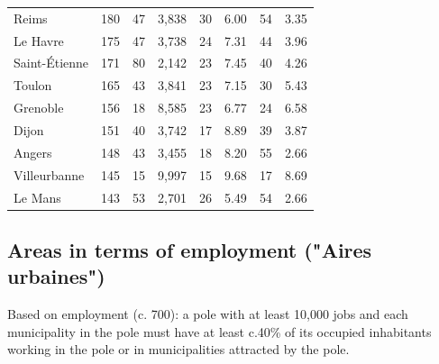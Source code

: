 \documentclass[11pt]{article}
\begin{document}
\begin{table}[H]
\begin{tabular}{llrrrrrr}
         Reims &        180 &         47 &        3,838 &         30 &       6.00 &         54 &        3.35 \\
      Le Havre &        175 &         47 &        3,738 &         24 &       7.31 &         44 &        3.96 \\
 Saint-Étienne &        171 &         80 &        2,142 &         23 &       7.45 &         40 &        4.26 \\
        Toulon &        165 &         43 &        3,841 &         23 &       7.15 &         30 &        5.43 \\
      Grenoble &        156 &         18 &        8,585 &         23 &       6.77 &         24 &        6.58 \\
         Dijon &        151 &         40 &        3,742 &         17 &       8.89 &         39 &        3.87 \\
        Angers &        148 &         43 &        3,455 &         18 &       8.20 &         55 &        2.66 \\
  Villeurbanne &        145 &         15 &        9,997 &         15 &       9.68 &         17 &        8.69 \\
       Le Mans &        143 &         53 &        2,701 &         26 &       5.49 &         54 &        2.66 \\
\bottomrule
\end{tabular}

\end{table}

\subsection{Areas in terms of employment ("Aires urbaines")}

Based on employment (c. 700): a pole with at least 10,000 jobs and each municipality in the pole must have at least c.40\% of its occupied inhabitants working in the pole or in municipalities attracted by the pole.
\end{document}
